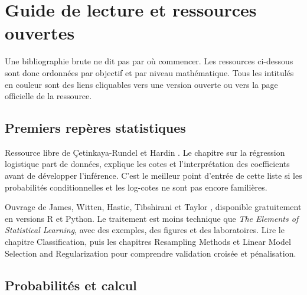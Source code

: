\chapter{Guide de lecture et ressources ouvertes}
\label{ch:reading-guide}

Une bibliographie brute ne dit pas par où commencer. Les ressources ci-dessous
sont donc ordonnées par objectif et par niveau mathématique. Tous les intitulés
en couleur sont des liens cliquables vers une version ouverte ou vers la page
officielle de la ressource.

\section{Premiers repères statistiques}

\begin{description}[style=nextline,leftmargin=0pt]
  \item[\href{https://openintrostat.github.io/ims/}{Introduction to Modern
  Statistics --- chapitre 9}] Ressource libre de Çetinkaya-Rundel et Hardin
  \cite{openintro2024}. Le chapitre sur la régression logistique part de données,
  explique les cotes et l'interprétation des coefficients avant de développer
  l'inférence. C'est le meilleur point d'entrée de cette liste si les probabilités
  conditionnelles et les log-cotes ne sont pas encore familières.

  \item[\href{https://www.statlearning.com/}{An Introduction to Statistical
  Learning}] Ouvrage de James, Witten, Hastie, Tibshirani et Taylor
  \cite{james2023}, disponible gratuitement en versions R et Python. Le traitement
  est moins technique que \emph{The Elements of Statistical Learning}, avec des
  exemples, des figures et des laboratoires. Lire le chapitre Classification,
  puis les chapitres Resampling Methods et Linear Model Selection and
  Regularization pour comprendre validation croisée et pénalisation.
\end{description}

\section{Probabilités et calcul}

